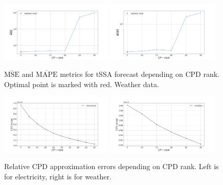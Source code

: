 \documentclass[referee, pdflatex]{sn-jnl}
\theoremstyle{definition}
\theoremstyle{plain}
\begin{document}
	\begin{figure}[h]
		\centering
		\includegraphics[width=0.48\textwidth, keepaspectratio]{../../experiments/weather/tssa/figs/prediction/MSE_rank.png}
		\includegraphics[width=0.48\textwidth, keepaspectratio]{../../experiments/weather/tssa/figs/prediction/MAPE_rank.png}
		\caption{$ \overline{\text{MSE}} $ and $ \overline{\text{MAPE}} $ metrics for tSSA forecast depending on CPD rank. Optimal point is marked with red. Weather data.}\label{fig:mse_mape_weather}
	\end{figure}
	
	\begin{figure}[h]
		\centering
		\includegraphics[width=0.48\textwidth, keepaspectratio]{../../experiments/electricity/tssa/figs/CPD_error.png}
		\includegraphics[width=0.48\textwidth, keepaspectratio]{../../experiments/weather/tssa/figs/CPD_error.png}
		\caption{Relative CPD approximation errors depending on CPD rank. Left is for electricity, right is for weather.}\label{fig:cpd_errors}
	\end{figure}
	
\end{document}

